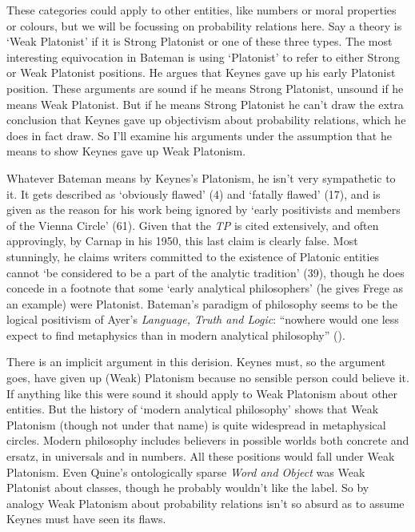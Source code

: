\documentclass[
  10pt,
  letterpaper,
  DIV=11,
  numbers=noendperiod,
  twoside]{scrartcl}
\begin{document}
These categories could apply to other entities, like numbers or moral
properties or colours, but we will be focussing on probability relations
here. Say a theory is `Weak Platonist' if it is Strong Platonist or one
of these three types. The most interesting equivocation in Bateman is
using `Platonist' to refer to either Strong or Weak Platonist positions.
He argues that Keynes gave up his early Platonist position. These
arguments are sound if he means Strong Platonist, unsound if he means
Weak Platonist. But if he means Strong Platonist he can't draw the extra
conclusion that Keynes gave up objectivism about probability relations,
which he does in fact draw. So I'll examine his arguments under the
assumption that he means to show Keynes gave up Weak Platonism.

Whatever Bateman means by Keynes's Platonism, he isn't very sympathetic
to it. It gets described as `obviously flawed' (4) and `fatally flawed'
(17), and is given as the reason for his work being ignored by `early
positivists and members of the Vienna Circle' (61). Given that the
\emph{TP} is cited extensively, and often approvingly, by Carnap in his
1950, this last claim is clearly false. Most stunningly, he claims
writers committed to the existence of Platonic entities cannot `be
considered to be a part of the analytic tradition' (39), though he does
concede in a footnote that some `early analytical philosophers' (he
gives Frege as an example) were Platonist. Bateman's paradigm of
philosophy seems to be the logical positivism of Ayer's \emph{Language,
Truth and Logic}: ``nowhere would one less expect to find metaphysics
than in modern analytical philosophy'' ().

There is an implicit argument in this derision. Keynes must, so the
argument goes, have given up (Weak) Platonism because no sensible person
could believe it. If anything like this were sound it should apply to
Weak Platonism about other entities. But the history of `modern
analytical philosophy' shows that Weak Platonism (though not under that
name) is quite widespread in metaphysical circles. Modern philosophy
includes believers in possible worlds both concrete and ersatz, in
universals and in numbers. All these positions would fall under Weak
Platonism. Even Quine's ontologically sparse \emph{Word and Object} was
Weak Platonist about classes, though he probably wouldn't like the
label. So by analogy Weak Platonism about probability relations isn't so
absurd as to assume Keynes must have seen its flaws.
\end{document}
